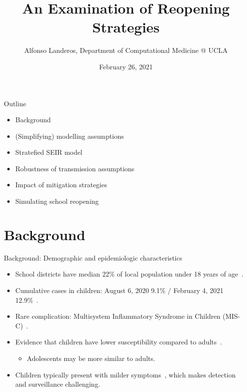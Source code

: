 \documentclass[8pt]{beamer}
\title{An Examination of Reopening Strategies}
\author{Alfonso Landeros, Department of Computational Medicine @ UCLA}
\date{February 26, 2021}
\begin{document}
\maketitle

\begin{frame}{Outline}
\begin{itemize}
    \item Background
    \item (Simplifying) modelling assumptions
    \item Stratefied SEIR model
    \item Robustness of transmission assumptions
    \item Impact of mitigation strategies
    \item Simulating school reopening
\end{itemize}
\end{frame}

\section{Background}

\begin{frame}{Background: Demographic and epidemiologic characteristics}
%
\begin{itemize}
    \item School districts have median 22\% of local population under 18 years of age~\footnotemark[1].
    \item Cumulative cases in children: August 6, 2020 9.1\% / February 4, 2021 12.9\%~\footnotemark[2].
    \item Rare complication: Multisystem Inflammatory Syndrome in Children (MIS-C)~\footnotemark[3].
    \item Evidence that children have lower susceptibility compared to adults~\footnotemark[4].
    \begin{itemize}
        \item Adolescents may be more similar to adults.
    \end{itemize}
    \item Children typically present with milder symptoms~\footnotemark[5], which makes detection and surveillance challenging.
\end{itemize}

\end{frame}
\end{document}
